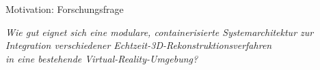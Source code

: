     

\begin{frame}{Motivation: Forschungsfrage}{}
    \vfill
    \begin{center}
        \large
        \textit{Wie gut eignet sich eine modulare, containerisierte Systemarchitektur zur\\
        Integration verschiedener Echtzeit-3D-Rekonstruktionsverfahren\\
        in eine bestehende Virtual-Reality-Umgebung?}
    \end{center}
    \vfill
\end{frame}
